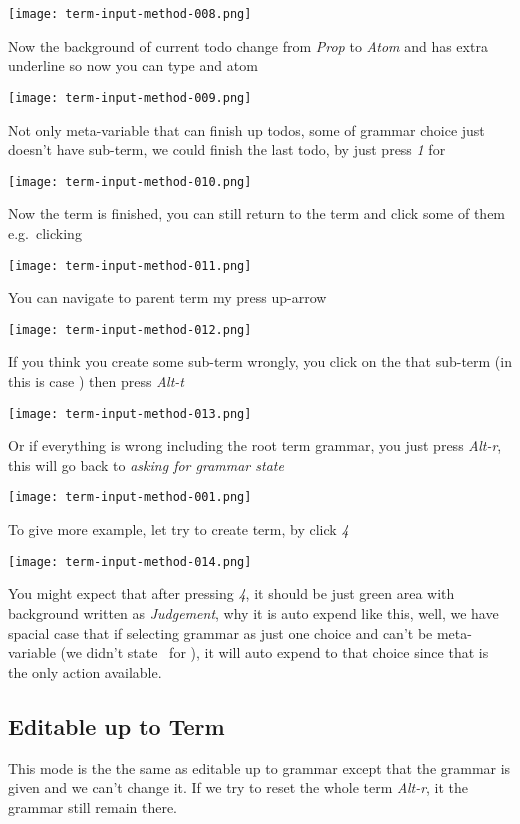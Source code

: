 \documentclass[master.tex]{subfiles}
\begin{document}
\centerline{\texttt{[image: term-input-method-008.png]}}

Now the background of current todo change from \emph{Prop} to \emph{Atom} and
has extra underline so now you can type and atom

\centerline{\texttt{[image: term-input-method-009.png]}}

Not only meta-variable that can finish up todos, some of grammar choice just
doesn't have sub-term, we could finish the last todo, by just press \emph{1} for \propTop

\centerline{\texttt{[image: term-input-method-010.png]}}

Now the term is finished, you can still return to the term and click some of
them e.g.\ clicking 

\centerline{\texttt{[image: term-input-method-011.png]}}

You can navigate to parent term my press up-arrow

\centerline{\texttt{[image: term-input-method-012.png]}}

If you think you create some sub-term wrongly, you click on the that sub-term
(in this is case ) then press \emph{Alt-t}

\centerline{\texttt{[image: term-input-method-013.png]}}

Or if everything is wrong including the root term grammar, you just press
\emph{Alt-r}, this will go back to \emph{asking for grammar state}

\centerline{\texttt{[image: term-input-method-001.png]}}

To give more example, let try to create  term, by click \emph{4}

\centerline{\texttt{[image: term-input-method-014.png]}}

You might expect that after pressing \emph{4}, it should be just green area with
background written as \emph{Judgement}, why it is auto expend like this, well,
we have spacial case that if selecting grammar as just one choice and can't be
meta-variable (we didn't state \kVarRegex\ for ), it will auto
expend to that choice since that is the only action available.

\subsection{Editable up to Term}
This mode is the the same as editable up to grammar except that the grammar is
given and we can't change it. If we try to reset the whole term \emph{Alt-r}, it
the grammar still remain there.
\end{document}
